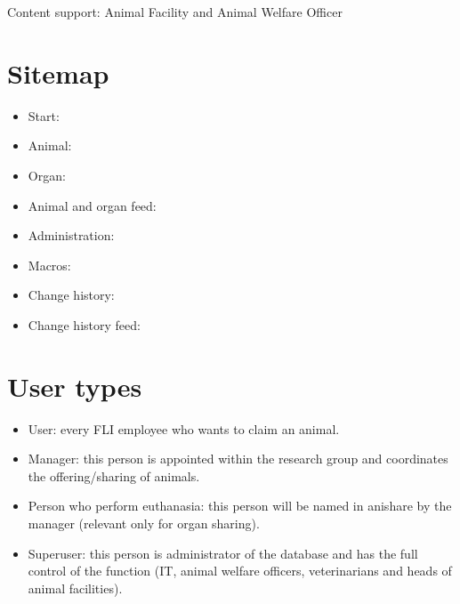 \documentclass[letterpaper,10pt,openany,oneside,english]{sphinxmanual}
\begin{document}
Content support: Animal Facility and Animal Welfare Officer


\chapter{Sitemap}
\label{\detokenize{index:sitemap}}\begin{itemize}
\item {} 
Start: 

\item {} 
Animal: 

\item {} 
Organ: 

\item {} 
Animal and organ feed: 

\item {} 
Administration: 

\item {} 
Macros: 

\item {} 
Change history: 

\item {} 
Change history feed: 

\end{itemize}


\chapter{User types}
\label{\detokenize{index:user-types}}\begin{itemize}
\item {} 
User: every FLI employee who wants to claim an animal.

\item {} 
Manager: this person is appointed within the research group and coordinates the offering/sharing of animals.

\item {} 
Person who perform euthanasia: this person will be named in anishare by the manager (relevant only for organ sharing).

\item {} 
Superuser: this person is administrator of the database and has the full control of the function (IT, animal welfare officers, veterinarians and heads of animal facilities).

\end{itemize}
\end{document}

